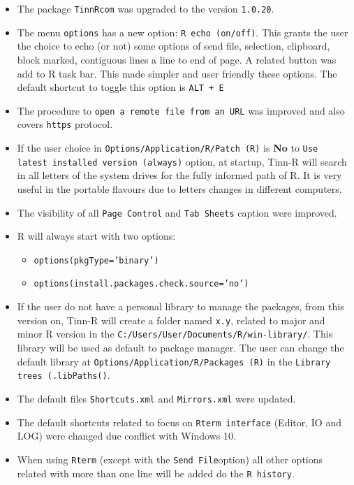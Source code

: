 \begin{itemize}
  \item The package \texttt{TinnRcom} was upgraded to the version \texttt{1.0.20}.
  \item The menu \texttt{options} has a new option: \texttt{R echo (on/off)}. This grants the user the choice to echo (or not)
    some options of send file, selection, clipboard, block marked, contiguous lines a line to end of page.
    A related button was add to R task bar. This made simpler and user friendly these options.
    The default shortcut to toggle this option is \texttt{ALT + E}
  \item The procedure to \texttt{open a remote file from an URL} was improved and also covers  \texttt{https} protocol.
  \item If the user choice in \texttt{Options/Application/R/Patch (R)} is
    \textbf{No} to \texttt{Use latest installed version (always)} option, at startup,
    Tinn-R will search in all letters of the system drives for the fully informed path of R.
    It is very useful in the portable flavours due to letters changes in different computers.
  \item The visibility of all \texttt{Page Control} and \texttt{Tab Sheets} caption were improved.
  \item R will always start with two options:
    \begin{itemize}
      \item \texttt{options(pkgType='binary')}
      \item \texttt{options(install.packages.check.source='no')}
    \end{itemize}
  \item If the user do not have a personal library to manage the packages,
    from this version on, Tinn-R will create a folder named \texttt{x.y}, related to major and minor R version in the \texttt{C:/Users/User/Documents/R/win-library/}.
    This library will be used as default to package manager. The user can change the default library at
    \texttt{Options/Application/R/Packages (R)} in the \texttt{Library trees (.libPaths()}.
  \item The default files \texttt{Shortcuts.xml} and \texttt{Mirrors.xml} were updated.
  \item The default shortcuts related to focus on \texttt{Rterm interface} (Editor, IO and LOG) were changed
    due conflict with Windows 10.
  \item When using \texttt{Rterm} (except with the \texttt{Send File}option) all other options related with more than one line will be added do the \texttt{R history}.

\end{itemize}
